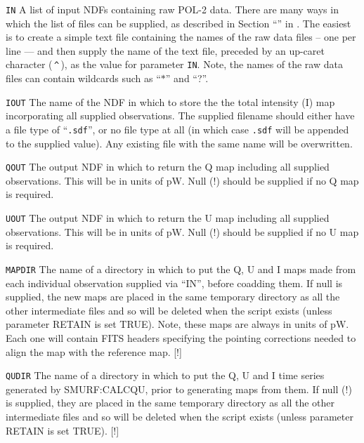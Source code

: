 \begin{aligndesc}
\item[\texttt{IN}] A list of input NDFs containing raw POL-2 data.
  There are many ways in which the list of files can be supplied, as
  described in Section ``'' in . The
  easiest is to create a simple text file containing the names of the
  raw data files -- one per line --- and then supply the name of the
  text file, preceded by an up-caret character (\,\texttt{\^{}}\,), as
  the value for parameter \texttt{IN}. Note, the names of the raw data
  files can contain wildcards such as ``$*$'' and ``?''.

\item[\texttt{IOUT}] The name of the NDF in which to store the the
  total intensity (I) map incorporating all supplied observations. The
  supplied filename should either have a file type of
  ``\texttt{.sdf}'', or no file type at all (in which case
  \texttt{.sdf} will be appended to the supplied value). Any existing
  file with the same name will be overwritten.

\item[\texttt{QOUT}] The output NDF in which to return the Q map
  including all supplied observations. This will be in units of
  pW. Null (!) should be supplied if no Q map is required.


\item[\texttt{UOUT}] The output NDF in which to return the U map
  including all supplied observations. This will be in units of
  pW. Null (!) should be supplied if no U map is required.

\item[\texttt{MAPDIR}] The name of a directory in which to put the Q,
  U and I maps made from each individual observation supplied via
  ``IN'', before coadding them. If null is supplied, the new maps are
  placed in the same temporary directory as all the other intermediate
  files and so will be deleted when the script exists (unless
  parameter RETAIN is set TRUE). Note, these maps are always in units
  of pW. Each one will contain FITS headers specifying the pointing
  corrections needed to align the map with the reference map. [!]


\item[\texttt{QUDIR}] The name of a directory in which to put the Q, U
  and I time series generated by SMURF:CALCQU, prior to generating
  maps from them. If null (!) is supplied, they are placed in the same
  temporary directory as all the other intermediate files and so will
  be deleted when the script exists (unless parameter RETAIN is set
  TRUE). [!]
\end{aligndesc}


